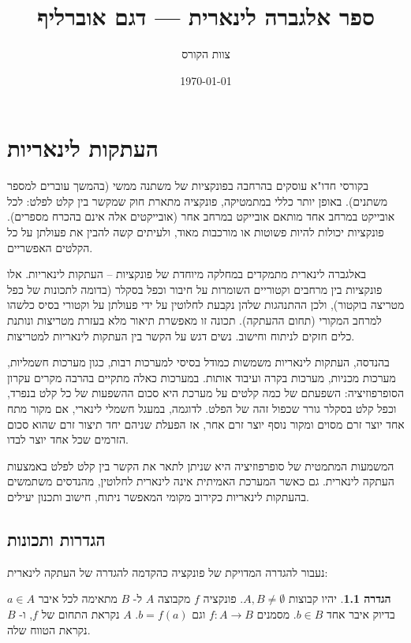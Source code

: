 \documentclass[12pt]{report}
\title{ספר אלגברה לינארית — דגם אוברליף}
\author{צוות הקורס}
\date{\today}
\theoremstyle{plain}
\theoremstyle{definition}
\newtheorem{definition}[theorem]{הגדרה}
\newcommand{\0}{\mathbf{0}}
\begin{document}
\maketitle

\chapter{העתקות לינאריות}\label{ch:linearmaps}

בקורסי חדו"א עוסקים בהרחבה בפונקציות של משתנה ממשי (בהמשך עוברים למספר משתנים). באופן יותר כללי במתמטיקה, פונקציה מתארת חוק שמקשר בין קלט לפלט: לכל אובייקט במרחב אחד מותאם אובייקט במרחב אחר (אובייקטים אלה אינם בהכרח מספרים). פונקציות יכולות להיות פשוטות או מורכבות מאוד, ולעיתים קשה להבין את פעולתן על כל הקלטים האפשריים.

באלגברה לינארית מתמקדים במחלקה מיוחדת של פונקציות – העתקות לינאריות. אלו פונקציות בין מרחבים וקטוריים השומרות על חיבור וכפל בסקלר (בדומה לתכונות של כפל מטריצה בוקטור), ולכן ההתנהגות שלהן נקבעת לחלוטין על ידי פעולתן על וקטורי בסיס כלשהו למרחב המקורי (תחום ההעתקה). תכונה זו מאפשרת תיאור מלא בעזרת מטריצות ונותנת כלים חזקים לניתוח וחישוב. נשים דגש על הקשר בין העתקות לינאריות למטריצות.

בהנדסה, העתקות לינאריות משמשות כמודל בסיסי למערכות רבות, כגון מערכות חשמליות, מערכות מכניות, מערכות בקרה ועיבוד אותות. במערכות כאלה מתקיים בהרבה מקרים עקרון הסופרפוזיציה: השפעתם של כמה קלטים על מערכת היא סכום ההשפעות של כל קלט בנפרד, וכפל קלט בסקלר גורר שכפול זהה של הפלט. לדוגמה, במעגל חשמלי לינארי, אם מקור מתח אחד יוצר זרם מסוים ומקור נוסף יוצר זרם אחר, אז הפעלת שניהם יחד תיצור זרם שהוא סכום הזרמים שכל אחד יוצר לבדו.

המשמעות המתמטית של סופרפוזיציה היא שניתן לתאר את הקשר בין קלט לפלט באמצעות העתקה לינארית. גם כאשר המערכת האמיתית אינה לינארית לחלוטין, מהנדסים משתמשים בהעתקות לינאריות כקירוב מקומי המאפשר ניתוח, חישוב ותכנון יעילים.

\section{הגדרות ותכונות}

נעבור להגדרה המדויקת של פונקציה כהקדמה להגדרה של העתקה לינארית:

\begin{definition}
יהיו קבוצות
$A,B\neq\emptyset$.
פונקציה 
$f$
מקבוצה 
$A$
ל-
$B$
מתאימה לכל איבר 
$a\in A$
בדיוק איבר אחד 
$b\in B$.
מסמנים 
$f:A\to B$
וגם
$b=f(a)$.
$A$
נקראת התחום של 
$f$,
ו-
$B$
נקראת הטווח שלה.
\end{definition}
\end{document}
